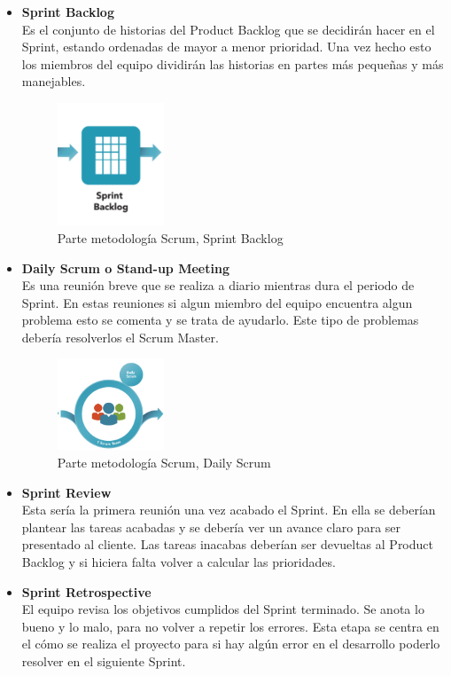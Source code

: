 \begin{itemize}
\item \textbf{Sprint Backlog}\\
Es el conjunto de historias del Product Backlog que se decidirán hacer en el Sprint, estando ordenadas de mayor a menor prioridad. Una vez hecho esto los miembros del equipo dividirán las historias en partes más pequeñas y más manejables.

\begin{figure}[H]
		\centering
		\includegraphics[width=0.3\textwidth] {sprint.png}
		\caption{Parte metodología Scrum, Sprint Backlog }
	\end{figure} 

 
 
\item \textbf{Daily Scrum o Stand-up Meeting}\\
Es una reunión breve que se realiza a diario mientras dura el periodo de Sprint. 
En estas reuniones si algun miembro del equipo encuentra algun problema esto se comenta y se trata de ayudarlo. Este tipo de problemas debería resolverlos el Scrum Master.

\begin{figure}[H]
		\centering
		\includegraphics[width=0.3\textwidth] {daily.png}
		\caption{Parte metodología Scrum, Daily Scrum }
	\end{figure} 

\item\textbf{ Sprint Review}\\
Esta sería la primera reunión una vez acabado el Sprint. En ella se deberían plantear las tareas acabadas y se debería ver un avance claro para ser presentado al cliente. Las tareas inacabas deberían ser devueltas al Product Backlog y si hiciera falta volver a calcular las prioridades.

 \item \textbf{Sprint Retrospective}\\
  El equipo revisa los objetivos cumplidos del Sprint terminado. Se anota lo bueno y lo malo, para no volver a repetir los errores. Esta etapa se centra en el cómo se realiza el proyecto para si hay algún error en el desarrollo poderlo resolver en el siguiente Sprint.
\end{itemize}



